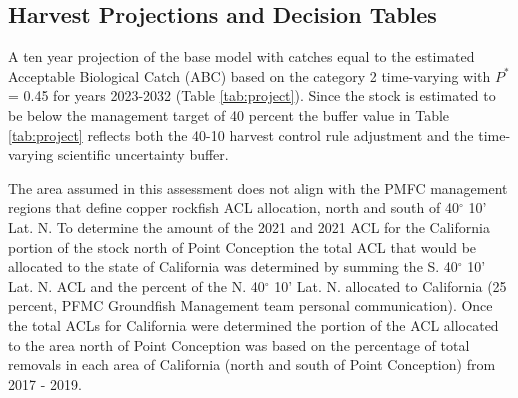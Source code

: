 \documentclass[11pt,
  english,
  a4paper,
]{article}
\begin{document}
\leavevmode\tagmcend\tagstructend\par


\hypertarget{harvest-projections-and-decision-tables}{%
\subsection{Harvest Projections and Decision Tables}\label{harvest-projections-and-decision-tables}}

\leavevmode\tagmcend\tagstructend


A ten year projection of the base model with catches equal to the estimated Acceptable Biological Catch (ABC) based on the category 2 time-varying with {\(P^*\)\leavevmode\tagmcend\tagstructend} = 0.45 for years 2023-2032 (Table \ref{tab:project}). Since the stock is estimated to be below the management target of 40 percent the buffer value in Table \ref{tab:project} reflects both the 40-10 harvest control rule adjustment and the time-varying scientific uncertainty buffer.

\leavevmode\tagmcend\tagstructend\par


The area assumed in this assessment does not align with the PMFC management regions that define copper rockfish ACL allocation, north and south of 40{\(^\circ\)\leavevmode\tagmcend\tagstructend} 10' Lat. N. To determine the amount of the 2021 and 2021 ACL for the California portion of the stock north of Point Conception the total ACL that would be allocated to the state of California was determined by summing the S. 40{\(^\circ\)\leavevmode\tagmcend\tagstructend} 10' Lat. N. ACL and the percent of the N. 40{\(^\circ\)\leavevmode\tagmcend\tagstructend} 10' Lat. N. allocated to California (25 percent, PFMC Groundfish Management team personal communication). Once the total ACLs for California were determined the portion of the ACL allocated to the area north of Point Conception was based on the percentage of total removals in each area of California (north and south of Point Conception) from 2017 - 2019.
\end{document}
